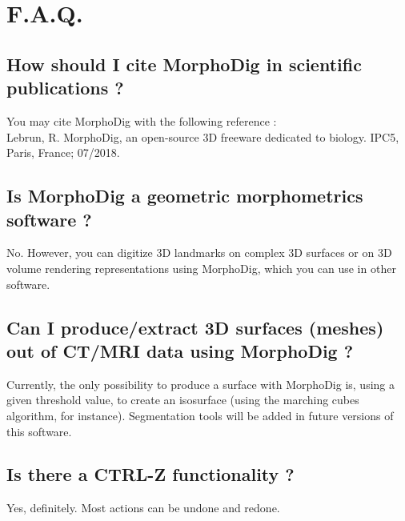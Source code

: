 
 \chapter{F.A.Q.}
		\minitoc  
    \section{How should I cite MorphoDig in scientific publications ?}
    You may  cite MorphoDig with the following reference :\\
		Lebrun, R. MorphoDig, an open-source 3D freeware dedicated to biology. IPC5, Paris, France; 07/2018.
    \section{Is MorphoDig a geometric morphometrics software ?}
    No. However, you can digitize 3D landmarks on complex 3D surfaces or on 3D volume rendering representations using MorphoDig, which you 
		can use in other software.
		\section{Can I produce/extract 3D surfaces (meshes) out of CT/MRI data using MorphoDig ?}
		Currently, the only possibility to produce a surface with MorphoDig is, using a given threshold value, to create an isosurface (using the marching cubes algorithm, for instance). Segmentation tools will be added in future versions of this software.
		\section{Is there a CTRL-Z functionality ?}
		Yes, definitely. Most actions can be undone and redone. 